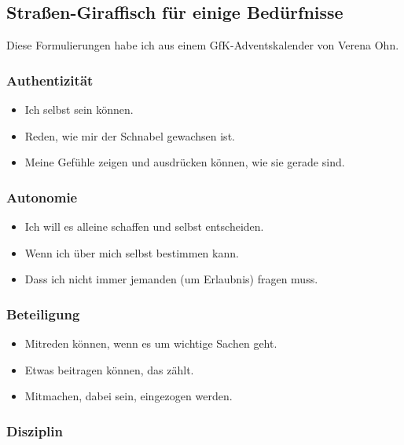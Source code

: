 \subsection{Straßen-Giraffisch für einige Bedürfnisse}

Diese Formulierungen habe ich aus einem GfK-Adventskalender von Verena Ohn. \cite{verena-ohn}


\subsubsection{Authentizität}

\begin{itemize}
  \item Ich selbst sein können.
  \item Reden, wie mir der Schnabel gewachsen ist.
  \item Meine Gefühle zeigen und ausdrücken können, wie sie gerade sind.
\end{itemize}


\subsubsection{Autonomie}

\begin{itemize}
  \item Ich will es alleine schaffen und selbst entscheiden.
  \item Wenn ich über mich selbst bestimmen kann.
  \item Dass ich nicht immer jemanden (um Erlaubnis) fragen muss.
\end{itemize}


\subsubsection{Beteiligung}

\begin{itemize}
  \item Mitreden können, wenn es um wichtige Sachen geht.
  \item Etwas beitragen können, das zählt.
  \item Mitmachen, dabei sein, eingezogen werden.
\end{itemize}


\subsubsection{Disziplin}

